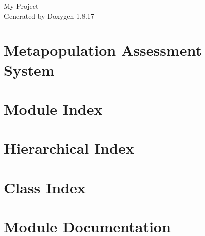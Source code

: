 \let\mypdfximage\pdfximage\def\pdfximage{\immediate\mypdfximage}\documentclass[twoside]{book}
\newcommand{\+}{\discretionary{\mbox{\scriptsize$\hookleftarrow$}}{}{}}
\newcommand{\clearemptydoublepage}{%
  \newpage{\pagestyle{empty}\cleardoublepage}%
}
\begin{document}
\hypersetup{pageanchor=false,
             bookmarksnumbered=true,
             pdfencoding=unicode
            }
\begin{titlepage}
\vspace*{7cm}
\begin{center}%
{\Large My Project }\\
\vspace*{1cm}
{\large Generated by Doxygen 1.8.17}\\
\end{center}
\end{titlepage}
\clearemptydoublepage
{}
\tableofcontents
\clearemptydoublepage
{}
\hypersetup{pageanchor=true}

\chapter{Metapopulation Assessment System}
\label{md___users_mattadmin__net_beans_projects_mas__r_e_a_d_m_e}

\chapter{Module Index}

\chapter{Hierarchical Index}

\chapter{Class Index}

\chapter{Module Documentation}

\end{document}
